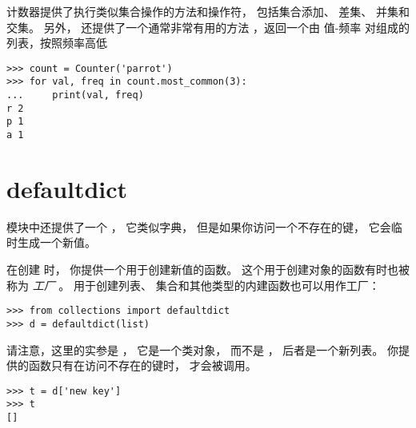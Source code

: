 计数器提供了执行类似集合操作的方法和操作符， 包括集合添加、 差集、 并集和交集。
另外， 还提供了一个通常非常有用的方法  ，返回一个由 值-频率 对组成的列表，按照频率高低

\begin{lstlisting}
>>> count = Counter('parrot')
>>> for val, freq in count.most_common(3):
...     print(val, freq)
r 2
p 1
a 1
\end{lstlisting}


\section{defaultdict}


 模块中还提供了一个  ， 它类似字典， 但是如果你访问一个不存在的键， 它会临时生成一个新值。


在创建  时， 你提供一个用于创建新值的函数。
这个用于创建对象的函数有时也被称为 {\em 工厂} 。  用于创建列表、 集合和其他类型的内建函数也可以用作工厂：

\begin{lstlisting}
>>> from collections import defaultdict
>>> d = defaultdict(list)
\end{lstlisting}


请注意，这里的实参是 ， 它是一个类对象， 而不是  ， 后者是一个新列表。
你提供的函数只有在访问不存在的键时， 才会被调用。

\begin{lstlisting}
>>> t = d['new key']
>>> t
[]
\end{lstlisting}


